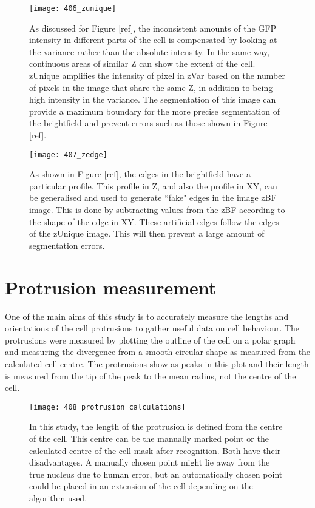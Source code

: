 \begin{figure}[p]
 \centering
 \texttt{[image: 406\_zunique]}
 \caption[zUnique example]{
 	As discussed for Figure [ref], the inconsistent amounts of the GFP intensity in different parts of the cell is compensated by looking at the variance rather than the absolute intensity. In the same way, continuous areas of similar Z can show the extent of the cell. zUnique amplifies the intensity of pixel in zVar based on the number of pixels in the image that share the same Z, in addition to being high intensity in the variance. The segmentation of this image can provide a maximum boundary for the more precise segmentation of the brightfield and prevent errors such as those shown in Figure [ref].
 }
 \label{fig:zunique}
\end{figure}

\begin{figure}[p]
 \centering
 \texttt{[image: 407\_zedge]}
 \caption{
 	As shown in Figure [ref], the edges in the brightfield have a particular profile. This profile in Z, and also the profile in XY, can be generalised and used to generate ``fake" edges in the image zBF image. This is done by subtracting values from the zBF according to the shape of the edge in XY. These artificial edges follow the edges of the zUnique image. This will then prevent a large amount of segmentation errors.
 }
 \label{fig:zedge}
\end{figure}

\section{Protrusion measurement}

One of the main aims of this study is to accurately measure the lengths and orientations of the cell protrusions to gather useful data on cell behaviour. The protrusions were measured by plotting the outline of the cell on a polar graph and measuring the divergence from a smooth circular shape as measured from the calculated cell centre. The protrusions show as peaks in this plot and their length is measured from the tip of the peak to the mean radius, not the centre of the cell.

\begin{figure}[p]
 \centering
 \texttt{[image: 408\_protrusion\_calculations]}
 \caption[Protrusion calulation]{
 	In this study, the length of the protrusion is defined from the centre of the cell. This centre can be the manually marked point or the calculated centre of the cell mask after recognition. Both have their disadvantages. A manually chosen point might lie away from the true nucleus due to human error, but an automatically chosen point could be placed in an extension of the cell depending on the algorithm used.
 }
 \label{fig:protrusioncalc}
\end{figure}

